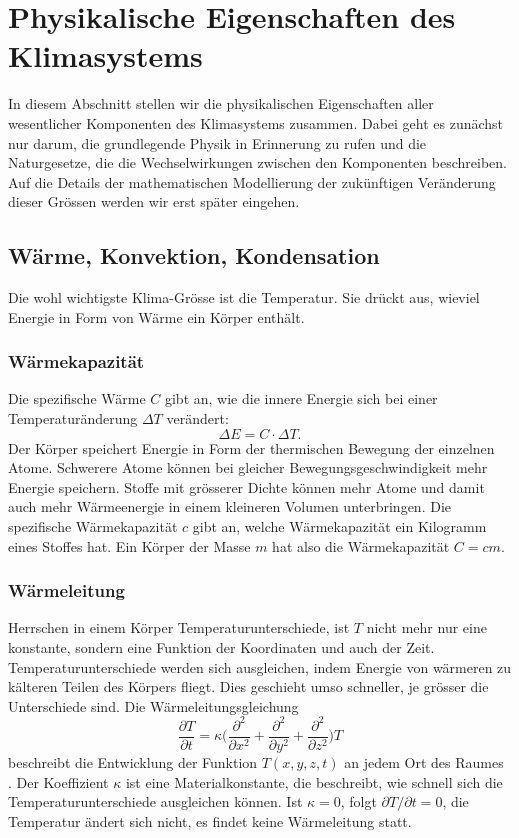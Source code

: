 %
%
%

\section{Physikalische Eigenschaften des Klimasystems\label{section:physik}}
In diesem Abschnitt stellen wir die physikalischen Eigenschaften
aller wesentlicher Komponenten des Klimasystems zusammen.
Dabei geht es zunächst nur darum, die grundlegende Physik in 
Erinnerung zu rufen und die Naturgesetze, die die Wechselwirkungen
zwischen den Komponenten beschreiben.
Auf die Details der mathematischen Modellierung der zukünftigen
Veränderung dieser Grössen werden wir erst später eingehen.

\subsection{Wärme, Konvektion, Kondensation}
Die wohl wichtigste Klima-Grösse ist die Temperatur.
Sie drückt aus, wieviel Energie in Form von Wärme ein Körper enthält.

\subsubsection{Wärmekapazität}
Die spezifische Wärme $C$ gibt an, wie die innere Energie sich bei
einer Temperaturänderung $\Delta T$ verändert:
\[
\Delta E = C\cdot\Delta T.
\]
Der Körper speichert Energie in Form der thermischen Bewegung der
einzelnen Atome.
Schwerere Atome können bei gleicher Bewegungsgeschwindigkeit 
mehr Energie speichern.
Stoffe mit grösserer Dichte können mehr Atome und damit auch mehr
Wärmeenergie in einem kleineren Volumen unterbringen.
Die spezifische Wärmekapazität $c$ gibt an, welche Wärmekapazität
ein Kilogramm eines Stoffes hat.
Ein Körper der Masse $m$ hat also die Wärmekapazität $C=cm$.

\subsubsection{Wärmeleitung}
Herrschen in einem Körper Temperaturunterschiede, ist $T$ nicht mehr
nur eine konstante, sondern eine Funktion der Koordinaten und auch der
Zeit.
Temperaturunterschiede werden sich ausgleichen, indem Energie von
wärmeren zu kälteren Teilen des Körpers fliegt.
Dies geschieht umso schneller, je grösser die Unterschiede sind.
Die Wärmeleitungsgleichung
\begin{equation}
\frac{\partial T}{\partial t}
=
\kappa
\biggl(
\frac{\partial^2}{\partial x^2}
+
\frac{\partial^2}{\partial y^2}
+
\frac{\partial^2}{\partial z^2}
\biggr)
T
\label{skript:waermeleitung}
\end{equation}
beschreibt die Entwicklung der Funktion $T(x,y,z,t)$ an jedem
Ort des Raumes \cite{skript:waermeleitung}.
Der Koeffizient $\kappa$ ist eine Materialkonstante, die beschreibt,
wie schnell sich die Temperaturunterschiede ausgleichen können.
Ist $\kappa=0$, folgt $\partial T/\partial t=0$, die Temperatur 
ändert sich nicht, es findet keine Wärmeleitung statt.

